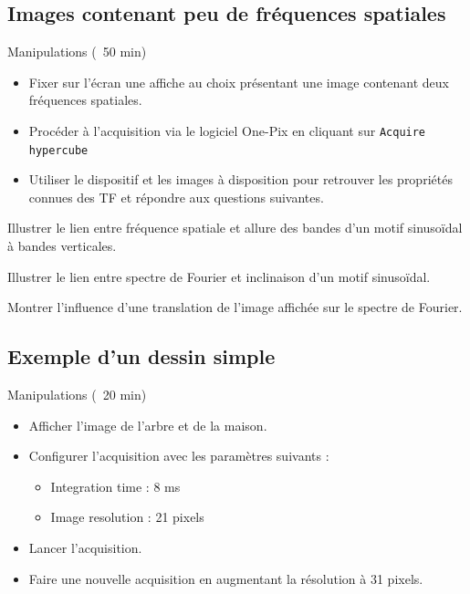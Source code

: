 \documentclass[a4paper,twoside,10pt]{book}
\begin{document}
\subsection{Images contenant peu de fréquences spatiales}

\begin{bclogo}[noborder=true, logo = \bcoutil,barre = line]{Manipulations (\faClockO\ 50 min)}
\begin{itemize}[label=]
\item Fixer sur l'écran une affiche au choix présentant une image contenant deux fréquences spatiales.
\item Procéder à l'acquisition via le logiciel One-Pix en cliquant sur \texttt{Acquire hypercube}
\item Utiliser le dispositif et les images à disposition pour retrouver les propriétés connues des TF et répondre aux questions suivantes.
\end{itemize}
\end{bclogo}

\begin{question}[resume]
\item Illustrer le lien entre fréquence spatiale et allure des bandes d'un motif sinusoïdal à bandes verticales.
\item Illustrer le lien entre spectre de Fourier et inclinaison d'un motif sinusoïdal.
\item Montrer l'influence d'une translation de l'image affichée sur le spectre de Fourier.
\end{question}


\subsection{Exemple d'un dessin simple}

\begin{bclogo}[noborder=true, logo = \bcoutil,barre = line]{Manipulations (\faClockO\ 20 min)}
\begin{itemize}[label=]
\item Afficher l'image de l'arbre et de la maison.
\item Configurer l'acquisition avec les paramètres suivants :
\begin{itemize}
\item Integration time : 8 ms
\item Image resolution : 21 pixels
\end{itemize}
\item Lancer l'acquisition.
\item Faire une nouvelle acquisition en augmentant la résolution à 31 pixels.
\end{itemize}
\end{bclogo}
\end{document}
